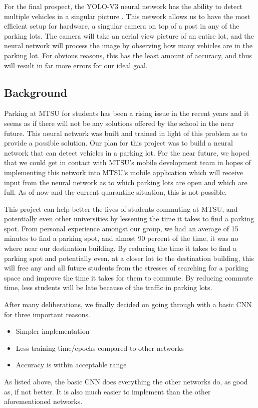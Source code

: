 \documentclass[conference]{IEEEtran}
\begin{document}
For the final prospect, the YOLO-V3 neural network has the ability to detect multiple vehicles in a singular picture \cite{b1}. This network allows us to have the most efficient setup for hardware, a singular camera on top of a post in any of the parking lots. The camera will take an aerial view picture of an entire lot, and the neural network will process the image by observing how many vehicles are in the parking lot. For obvious reasons, this has the least amount of accuracy, and thus will result in far more errors for our ideal goal.

\subsection{Background}

Parking at MTSU for students has been a rising issue in the recent years and it seems as if there will not be any solutions offered by the school in the near future. This neural network was built and trained in light of this problem as to provide a possible solution. Our plan for this project was to build a neural network that can detect vehicles in a parking lot. For the near future, we hoped that we could get in contact with MTSU's mobile development team in hopes of implementing this network into MTSU's mobile application which will receive input from the neural network as to which parking lots are open and which are full. As of now and the current quarantine situation, this is not possible.

This project can help better the lives of students commuting at MTSU, and potentially even other universities by lessening the time it takes to find a parking spot. From personal experience amongst our group, we had an average of 15 minutes to find a parking spot, and almost 90 percent of the time, it was no where near our destination building. By reducing the time it takes to find a parking spot and potentially even, at a closer lot to the destination building, this will free any and all future students from the stresses of searching for a parking space and improve the time it takes for them to commute. By reducing commute time, less students will be late because of the traffic in parking lots.

After many deliberations, we finally decided on going through with a basic CNN for three important reasons. 
\begin{itemize}
    \item Simpler implementation 
    \item Less training time/epochs compared to other networks
    \item Accuracy is within acceptable range
\end{itemize}
As listed above, the basic CNN does everything the other networks do, as good as, if not better. It is also much easier to implement than the other aforementioned networks. 
\end{document}
